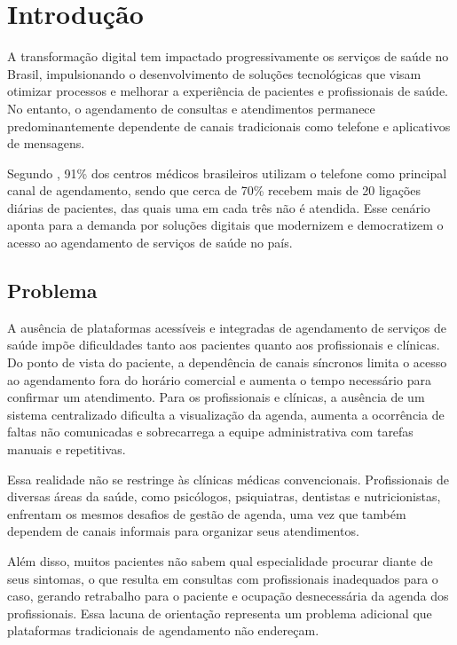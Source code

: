 \chapter{Introdução}
\label{chap:introduction}

A transformação digital tem impactado progressivamente os serviços
de saúde no Brasil, impulsionando o desenvolvimento de soluções
tecnológicas que visam otimizar processos e melhorar a experiência
de pacientes e profissionais de saúde. No entanto, o agendamento
de consultas e atendimentos permanece predominantemente dependente
de canais tradicionais como telefone e aplicativos de mensagens.

Segundo , 91\% dos centros médicos
brasileiros utilizam o telefone como principal canal de
agendamento, sendo que cerca de 70\% recebem mais de 20 ligações
diárias de pacientes, das quais uma em cada três não é atendida.
Esse cenário aponta para a demanda por soluções digitais que
modernizem e democratizem o acesso ao agendamento de serviços
de saúde no país.

\section{Problema}
\label{sec:problem}

A ausência de plataformas acessíveis e integradas de agendamento
de serviços de saúde impõe dificuldades tanto aos pacientes
quanto aos profissionais e clínicas. Do ponto de vista do
paciente, a dependência de canais síncronos limita o acesso
ao agendamento fora do horário comercial e aumenta o tempo
necessário para confirmar um atendimento. Para os profissionais
e clínicas, a ausência de um sistema centralizado dificulta a
visualização da agenda, aumenta a ocorrência de faltas não
comunicadas e sobrecarrega a equipe administrativa com tarefas
manuais e repetitivas.

Essa realidade não se restringe às clínicas médicas
convencionais. Profissionais de diversas áreas da saúde, como
psicólogos, psiquiatras, dentistas e nutricionistas, enfrentam
os mesmos desafios de gestão de agenda, uma vez que também
dependem de canais informais para organizar seus atendimentos.

Além disso, muitos pacientes não sabem qual especialidade
procurar diante de seus sintomas, o que resulta em consultas
com profissionais inadequados para o caso, gerando retrabalho
para o paciente e ocupação desnecessária da agenda dos
profissionais. Essa lacuna de orientação representa um problema
adicional que plataformas tradicionais de agendamento não
endereçam.

